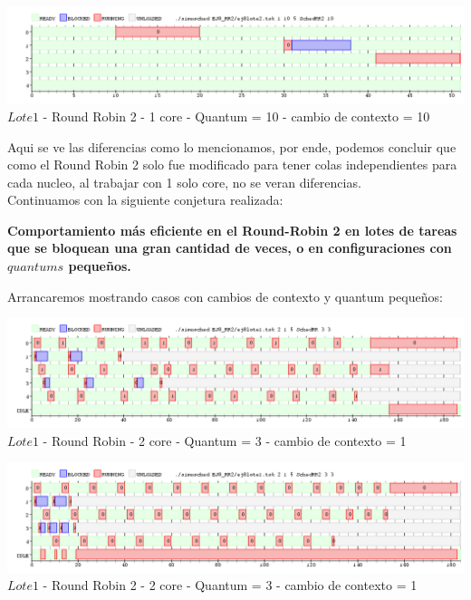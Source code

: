  \begin{center}
    	\includegraphics[width=450pt]{./EJ8_RR2/dif3corerr2.png}
	{$Lote 1$ - Round Robin 2 - 1 core - Quantum = 10 - cambio de contexto = 10}	
 \end{center}
 
  \indent Aqui se ve las diferencias como lo mencionamos, por ende, podemos concluir que como el Round Robin 2 solo fue modificado 
  para tener colas independientes para cada nucleo, al trabajar con 1 solo core, no se veran diferencias.\\

  \indent Continuamos con la siguiente conjetura realizada:
  
  \begin{center}
   \textbf{Comportamiento más eficiente en el Round-Robin 2 en lotes de tareas que se bloquean una gran cantidad de veces, 
   o  en configuraciones con $quantums$ pequeños.}
  \end{center}
  
  \indent Arrancaremos mostrando casos con cambios de contexto y quantum pequeños:
  
   \begin{center}
    	\includegraphics[width=450pt]{./EJ8_RR2/dif4corerr.png}
	{$Lote 1$ - Round Robin - 2 core - Quantum = 3 - cambio de contexto = 1}	
 \end{center}
 
 \begin{center}
    	\includegraphics[width=450pt]{./EJ8_RR2/dif4corerr2.png}
	{$Lote 1$ - Round Robin 2 - 2 core - Quantum = 3 - cambio de contexto = 1}	
 \end{center}
 
